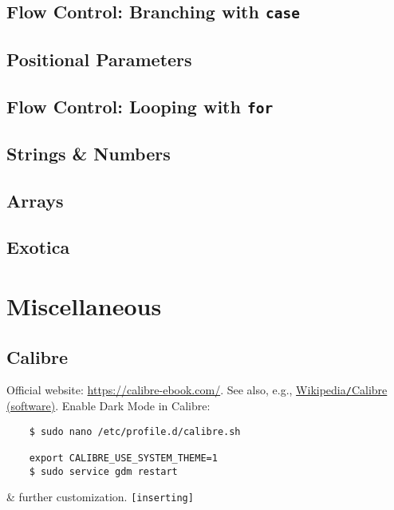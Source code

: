 \documentclass[oneside]{book}
\numberwithin{equation}{section}
\begin{document}
\section{Flow Control: Branching with \texttt{case}}


\section{Positional Parameters}


\section{Flow Control: Looping with \texttt{for}}


\section{Strings \& Numbers}


\section{Arrays}


\section{Exotica}


\chapter{Miscellaneous}

\section{Calibre}
Official website: \url{https://calibre-ebook.com/}. See also, e.g., \href{https://en.wikipedia.org/wiki/Calibre_(software)}{Wikipedia\texttt{/}Calibre (software)}. Enable Dark Mode in Calibre:
\begin{verbatim}
	$ sudo nano /etc/profile.d/calibre.sh
	
	export CALIBRE_USE_SYSTEM_THEME=1
	$ sudo service gdm restart
\end{verbatim}
\& further customization. \texttt{[inserting]}


\printbibliography[heading=bibintoc]
	
\end{document}

